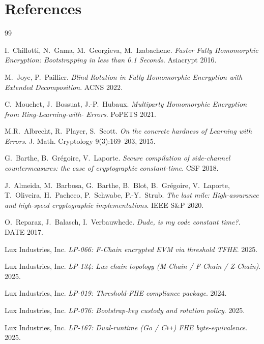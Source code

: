 \documentclass[11pt,a4paper]{article}
\begin{document}
\section{References}

\begin{thebibliography}{99}

I.~Chillotti, N.~Gama, M.~Georgieva, M.~Izabachene.
\emph{Faster Fully Homomorphic Encryption: Bootstrapping in less
than 0.1 Seconds}. Asiacrypt 2016.

M.~Joye, P.~Paillier.
\emph{Blind Rotation in Fully Homomorphic Encryption with Extended
Decomposition}. ACNS 2022.

C.~Mouchet, J.~Bossuat, J.-P.~Hubaux.
\emph{Multiparty Homomorphic Encryption from Ring-Learning-with-
Errors}. PoPETS 2021.

M.R.~Albrecht, R.~Player, S.~Scott.
\emph{On the concrete hardness of Learning with Errors}.
J. Math. Cryptology 9(3):169--203, 2015.

G.~Barthe, B.~Gr\'egoire, V.~Laporte.
\emph{Secure compilation of side-channel countermeasures: the case
of cryptographic constant-time}. CSF 2018.

J.~Almeida, M.~Barbosa, G.~Barthe, B.~Blot, B.~Gr\'egoire,
V.~Laporte, T.~Oliveira, H.~Pacheco, P.~Schwabe, P.-Y.~Strub.
\emph{The last mile: High-assurance and high-speed cryptographic
implementations}. IEEE S\&P 2020.

O.~Reparaz, J.~Balasch, I.~Verbauwhede.
\emph{Dude, is my code constant time?}. DATE 2017.

Lux Industries, Inc.
\emph{LP-066: F-Chain encrypted EVM via threshold TFHE}. 2025.

Lux Industries, Inc.
\emph{LP-134: Lux chain topology (M-Chain / F-Chain / Z-Chain)}. 2025.

Lux Industries, Inc.
\emph{LP-019: Threshold-FHE compliance package}. 2024.

Lux Industries, Inc.
\emph{LP-076: Bootstrap-key custody and rotation policy}. 2025.

Lux Industries, Inc.
\emph{LP-167: Dual-runtime (Go / C\texttt{++}) FHE byte-equivalence}. 2025.

\end{thebibliography}
\end{document}
